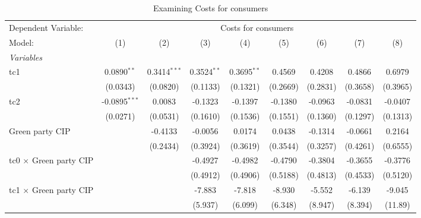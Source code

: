 
\begin{table}[htbp]
   \caption{Examining Costs for consumers}
   \centering
   \begin{tabular}{lcccccccc}
      \tabularnewline \midrule \midrule
      Dependent Variable: & \multicolumn{8}{c}{Costs for consumers}\\
      Model:                                  & (1)             & (2)            & (3)           & (4)           & (5)      & (6)      & (7)      & (8)\\  
      \midrule
      \emph{Variables}\\
      tc1                                     & 0.0890$^{**}$   & 0.3414$^{***}$ & 0.3524$^{**}$ & 0.3695$^{**}$ & 0.4569   & 0.4208   & 0.4866   & 0.6979\\   
                                              & (0.0343)        & (0.0820)       & (0.1133)      & (0.1321)      & (0.2669) & (0.2831) & (0.3658) & (0.3965)\\   
      tc2                                     & -0.0895$^{***}$ & 0.0083         & -0.1323       & -0.1397       & -0.1380  & -0.0963  & -0.0831  & -0.0407\\   
                                              & (0.0271)        & (0.0531)       & (0.1610)      & (0.1536)      & (0.1551) & (0.1360) & (0.1297) & (0.1313)\\   
      Green party CIP                         &                 & -0.4133        & -0.0056       & 0.0174        & 0.0438   & -0.1314  & -0.0661  & 0.2164\\   
                                              &                 & (0.2434)       & (0.3924)      & (0.3619)      & (0.3544) & (0.3257) & (0.4261) & (0.6555)\\   
      tc0 $\times$ Green party CIP            &                 &                & -0.4927       & -0.4982       & -0.4790  & -0.3804  & -0.3655  & -0.3776\\   
                                              &                 &                & (0.4912)      & (0.4906)      & (0.5188) & (0.4813) & (0.4533) & (0.5120)\\   
      tc1 $\times$ Green party CIP            &                 &                & -7.883        & -7.818        & -8.930   & -5.552   & -6.139   & -9.045\\   
                                              &                 &                & (5.937)       & (6.099)       & (6.348)  & (8.947)  & (8.394)  & (11.89)\\   

\end{tabular}
\end{table}
